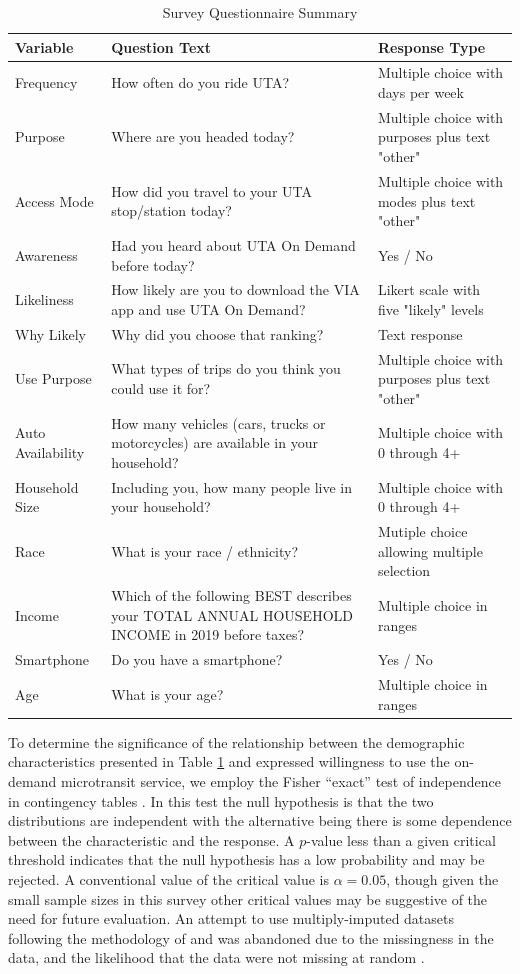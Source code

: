 \documentclass[smartcities,article,submit,moreauthors,pdftex]{mdpi}
\begin{document}
\begin{table}

\caption{\label{tab:survey-questions}Survey Questionnaire Summary}
\centering
\begin{tabular}[t]{lp{}p{}}
\toprule
Variable & Question Text & Response Type\\
\midrule
Frequency & How often do you ride UTA? & Multiple choice with days per week\\
Purpose & Where are you headed today? & Multiple choice with purposes plus text "other"\\
Access Mode & How did you travel to your UTA stop/station today? & Multiple choice with modes plus text "other"\\
Awareness & Had you heard about UTA On Demand before today? & Yes / No\\
Likeliness & How likely are you to download the VIA app and use UTA On Demand? & Likert scale with five "likely" levels\\
\addlinespace
Why Likely & Why did you choose that ranking? & Text response\\
Use Purpose & What types of trips do you think you could use it for? & Multiple choice with purposes plus text "other"\\
Auto Availability & How many vehicles (cars, trucks or motorcycles) are available in your household? & Multiple choice with 0 through 4+\\
Household Size & Including you, how many people live in your household? & Multiple choice with 0 through 4+\\
Race & What is your race / ethnicity? & Mutiple choice allowing multiple selection\\
\addlinespace
Income & Which of the following BEST describes your TOTAL ANNUAL HOUSEHOLD INCOME in 2019 before taxes? & Multiple choice in ranges\\
Smartphone & Do you have a smartphone? & Yes / No\\
Age & What is your age? & Multiple choice in ranges\\
\bottomrule
\end{tabular}
\end{table}

To determine the significance of the relationship between the demographic
characteristics presented in Table \ref{tab:survey-questions} and expressed
willingness to use the on-demand microtransit service, we employ the Fisher
``exact'' test of independence in contingency tables \citep{fisherExact}. In this
test the null hypothesis is that the two distributions are independent with the
alternative being there is some dependence between the characteristic and the
response. A \(p\)-value less than a given critical threshold indicates that the
null hypothesis has a low probability and may be rejected. A conventional value
of the critical value is \(\alpha=0.05\), though given the small sample sizes in
this survey other critical values may be suggestive of the need for future
evaluation. An attempt to use multiply-imputed datasets following the
methodology of \citet{mice2011} and \citet{LichtThesis} was abandoned due to the
missingness in the data, and the likelihood that the data were not missing at
random \citep{jakobsen2017}.
\end{document}
